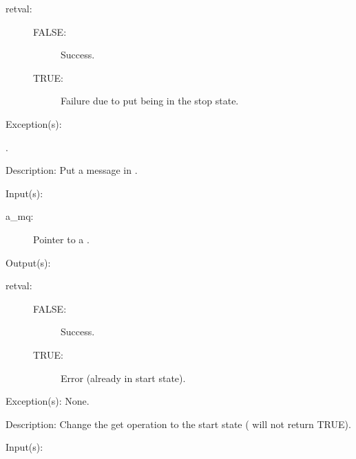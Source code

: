 \begin{capi}
\begin{capilist}
\begin{description}
		\item[retval: ]
			\begin{description}\item[]
			\item[FALSE: ] Success.
			\item[TRUE: ] Failure due to put being in the stop
				state.
			\end{description}
		\end{description}
	\item[Exception(s): ]
		\begin{description}\item[]
		\item[.]
		\end{description}
	\item[Description: ]
		Put a message in .
	\end{capilist}
\label{mq_get_start}
	\begin{capilist}
	\item[Input(s): ]
		\begin{description}\item[]
		\item[a\_mq: ]
			Pointer to a .
		\end{description}
	\item[Output(s): ]
		\begin{description}\item[]
		\item[retval: ]
			\begin{description}\item[]
			\item[FALSE: ] Success.
			\item[TRUE: ] Error (already in start state).
			\end{description}
		\end{description}
	\item[Exception(s): ] None.
	\item[Description: ]
		Change the get operation to the start state
		( will not return TRUE).
	\end{capilist}
\label{mq_get_stop}
	\begin{capilist}
	\item[Input(s): ]
		\begin{description}\item[]

\end{description}
\end{capilist}
\end{capi}
